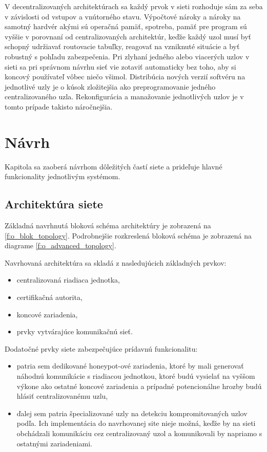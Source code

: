 \documentclass[12pt,a4wide,oneside,openright]{report}
\begin{document}
V decentralizovaných architektúrach sa každý prvok v sieti rozhoduje sám za seba v závislosti od vstupov a vnútorného stavu. Výpočtové nároky a nároky na samotný hardvér akými sú operačná pamäť, spotreba, pamäť pre program sú vyššie v porovnaní od centralizovaných architektúr, keďže každý uzol musí byť schopný udržiavať routovacie tabuľky, reagovať na vzniknuté situácie a byť robustný s pohľadu zabezpečenia. Pri zlyhaní jedného alebo viacerých uzlov v sieti sa pri správnom návrhu sieť vie zotaviť automaticky bez toho, aby si koncový používateľ vôbec niečo všimol. Distribúcia nových verzií softvéru na jednotlivé uzly je o kúsok zložitejšia ako preprogramovanie jedného centralizovaného uzla. Rekonfigurácia a manažovanie jednotlivých uzlov je v tomto prípade takisto náročnejšia.



\chapter{Návrh} \label{s_navrh}
Kapitola sa zaoberá návrhom dôležitých častí siete a prideľuje hlavné funkcionality jednotlivým systémom.

\section{Architektúra siete}
Základná navrhnutá bloková schéma architektúry je zobrazená na \ref{f:o_blok_topology}. Podrobnejšie rozkreslená bloková schéma je zobrazená na diagrame \ref{f:o_advanced_topology}.

Navrhovaná architektúra sa skladá z nasledujúcich základných prvkov:
\singlespacing
\begin{itemize}
	\item centralizovaná riadiaca jednotka,
	\item certifikačná autorita,
	\item koncové zariadenia,
	\item prvky vytvárajúce komunikačnú sieť.
\end{itemize}
\onehalfspacing
Dodatočné prvky siete zabezpečujúce prídavnú funkcionalitu:
\singlespacing
\begin{itemize}
	\item patria sem dedikované honeypot-ové zariadenia, ktoré by mali generovať náhodnú komunikácie s riadiacou jednotkou, ktoré budú vysielať na vyššom výkone ako ostatné koncové zariadenia a prípadné potencionálne hrozby budú hlásiť centralizovanému uzlu,
	\item ďalej sem patria špecializované uzly na detekciu kompromitovaných uzlov podľa\cite{compromisedsensors}. Ich implementácia do navrhovanej site nieje možná, keďže by na sieti obchádzali komunikáciu cez centralizovaný uzol a komunikovali by napriamo s ostatnými zariadeniami.
\end{itemize}
\onehalfspacing
\end{document}
